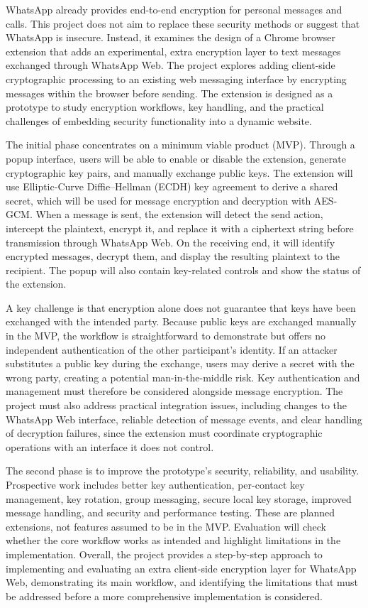 \documentclass[11pt]{article}
\begin{document}
WhatsApp already provides end-to-end encryption for personal messages and calls. This project does not aim to replace these security methods or suggest that WhatsApp is insecure. Instead, it examines the design of a Chrome browser extension that adds an experimental, extra encryption layer to text messages exchanged through WhatsApp Web. The project explores adding client-side cryptographic processing to an existing web messaging interface by encrypting messages within the browser before sending. The extension is designed as a prototype to study encryption workflows, key handling, and the practical challenges of embedding security functionality into a dynamic website.

The initial phase concentrates on a minimum viable product (MVP). Through a popup interface, users will be able to enable or disable the extension, generate cryptographic key pairs, and manually exchange public keys. The extension will use Elliptic-Curve Diffie–Hellman (ECDH) key agreement to derive a shared secret, which will be used for message encryption and decryption with AES-GCM. When a message is sent, the extension will detect the send action, intercept the plaintext, encrypt it, and replace it with a ciphertext string before transmission through WhatsApp Web. On the receiving end, it will identify encrypted messages, decrypt them, and display the resulting plaintext to the recipient. The popup will also contain key-related controls and show the status of the extension.

A key challenge is that encryption alone does not guarantee that keys have been exchanged with the intended party. Because public keys are exchanged manually in the MVP, the workflow is straightforward to demonstrate but offers no independent authentication of the other participant’s identity. If an attacker substitutes a public key during the exchange, users may derive a secret with the wrong party, creating a potential man-in-the-middle risk. Key authentication and management must therefore be considered alongside message encryption. The project must also address practical integration issues, including changes to the WhatsApp Web interface, reliable detection of message events, and clear handling of decryption failures, since the extension must coordinate cryptographic operations with an interface it does not control.

The second phase is to improve the prototype’s security, reliability, and usability. Prospective work includes better key authentication, per-contact key management, key rotation, group messaging, secure local key storage, improved message handling, and security and performance testing. These are planned extensions, not features assumed to be in the MVP. Evaluation will check whether the core workflow works as intended and highlight limitations in the implementation. Overall, the project provides a step-by-step approach to implementing and evaluating an extra client-side encryption layer for WhatsApp Web, demonstrating its main workflow, and identifying the limitations that must be addressed before a more comprehensive implementation is considered.
\end{document}
